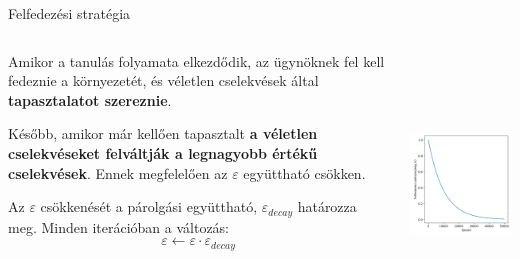 \documentclass[english, aspectratio=169]{beamer}
\begin{document}
\begin{frame}{Felfedezési stratégia}
\begin{columns}
\begin{column}{.5\textwidth}
Amikor a tanulás folyamata elkezdődik, az ügynöknek fel kell fedeznie a környezetét, és véletlen cselekvések által \textbf{tapasztalatot szereznie}.\par\smallskip
Később, amikor már kellően tapasztalt \textbf{a véletlen cselekvéseket felváltják a legnagyobb értékű cselekvések}. Ennek megfelelően az $\varepsilon$ együttható csökken.\par\smallskip
Az $\varepsilon$ csökkenését a párolgási együttható, $\varepsilon_{decay}$ határozza meg. Minden iterációban a változás:
\[
\varepsilon \leftarrow \varepsilon \cdot \varepsilon_{decay}
\]
\end{column}
\begin{column}{.5\textwidth}
\begin{center}
\includegraphics[width=7cm, height=7cm, keepaspectratio]{images/reinforcement_15.png}
\end{center}
\end{column}
\end{columns}
\end{frame}
\end{document}
